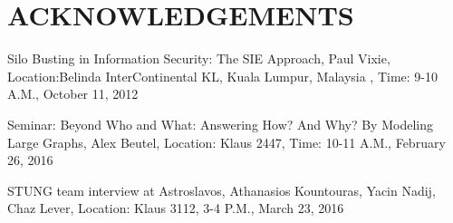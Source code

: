 \documentclass{acm_proc_article-sp}
\begin{document}
\section{ACKNOWLEDGEMENTS}


Silo Busting in Information Security: The SIE Approach, Paul Vixie, Location:Belinda InterContinental KL, Kuala Lumpur, Malaysia , Time: 9-10 A.M., October 11, 2012

Seminar: Beyond Who and What: Answering How? And Why? By Modeling Large Graphs, Alex Beutel, Location: Klaus 2447, Time: 10-11 A.M., February 26, 2016

STUNG team interview at Astroslavos, Athanasios Kountouras, Yacin Nadij, Chaz Lever, Location: Klaus 3112, 3-4 P.M., March 23, 2016


\paragraph{}




\end{document}
